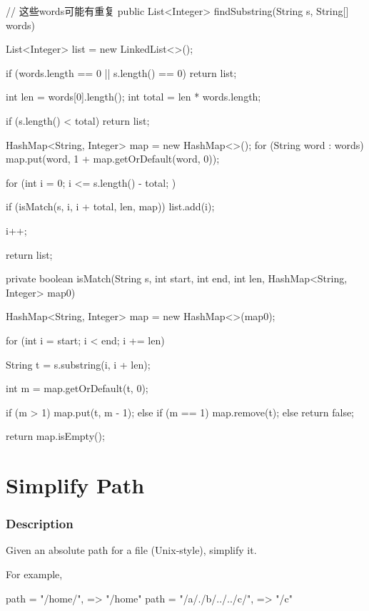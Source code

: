 \begin{Code}
// 这些words可能有重复
public List<Integer> findSubstring(String s, String[] words) {
    List<Integer> list = new LinkedList<>();

    if (words.length == 0 || s.length() == 0) {
        return list;
    }

    int len = words[0].length();
    int total = len * words.length;

    if (s.length() < total) {
        return list;
    }

    HashMap<String, Integer> map = new HashMap<>();
    for (String word : words) {
        map.put(word, 1 + map.getOrDefault(word, 0));
    }

    for (int i = 0; i <= s.length() - total; ) {
        if (isMatch(s, i, i + total, len, map)) {
            list.add(i);
        }

        i++;
    }

    return list;
}
\end{Code}
\newpage
\begin{Code}
private boolean isMatch(String s, int start, int end, int len, HashMap<String, Integer> map0) {
    HashMap<String, Integer> map = new HashMap<>(map0);

    for (int i = start; i < end; i += len) {
        String t = s.substring(i, i + len);

        int m = map.getOrDefault(t, 0);

        if (m > 1) {
            map.put(t, m - 1);
        } else if (m == 1) {
            map.remove(t);
        } else {
            return false;
        }
    }

    return map.isEmpty();
}
\end{Code}

\newpage

\section{Simplify Path} %

\subsubsection{Description}
Given an absolute path for a file (Unix-style), simplify it.

For example,
\begin{Code}
path = "/home/", => "/home"
path = "/a/./b/../../c/", => "/c"
\end{Code}

